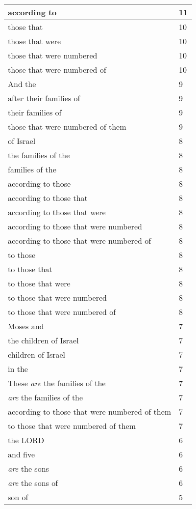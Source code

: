 \begin{center}
\begin{longtable}{|p{3.0in}|p{0.5in}|}
according to & 11\\ \hline 
those that & 10\\ \hline 
those that were & 10\\ \hline 
those that were numbered & 10\\ \hline 
those that were numbered of & 10\\ \hline 
And the & 9\\ \hline 
after their families of & 9\\ \hline 
their families of & 9\\ \hline 
those that were numbered of them & 9\\ \hline 
of Israel & 8\\ \hline 
the families of the & 8\\ \hline 
families of the & 8\\ \hline 
according to those & 8\\ \hline 
according to those that & 8\\ \hline 
according to those that were & 8\\ \hline 
according to those that were numbered & 8\\ \hline 
according to those that were numbered of & 8\\ \hline 
to those & 8\\ \hline 
to those that & 8\\ \hline 
to those that were & 8\\ \hline 
to those that were numbered & 8\\ \hline 
to those that were numbered of & 8\\ \hline 
Moses and & 7\\ \hline 
the children of Israel & 7\\ \hline 
children of Israel & 7\\ \hline 
in the & 7\\ \hline 
These \emph{are} the families of the & 7\\ \hline 
\emph{are} the families of the & 7\\ \hline 
according to those that were numbered of them & 7\\ \hline 
to those that were numbered of them & 7\\ \hline 
the LORD & 6\\ \hline 
and five & 6\\ \hline 
\emph{are} the sons & 6\\ \hline 
\emph{are} the sons of & 6\\ \hline 
son of & 5\\ \hline 

\end{longtable}
\end{center}
